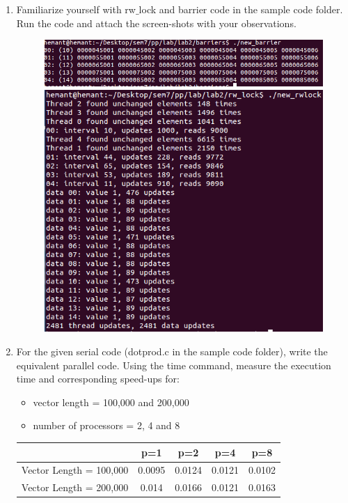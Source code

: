\documentclass{sem5}
\author{Dilip Puri}
\begin{document}
\begin{enumerate}
\item Familiarize yourself with rw$\_$lock and barrier code in the sample code folder. Run the code and attach the screen-shots with your observations.
\begin{figure}[!htp]
\centering
\includegraphics[scale=.4]{../barrier.png}\\
\includegraphics[scale=.4]{../rwlock.png}
\end{figure}
\item For the given serial code (dotprod.c in the sample code folder), write the equivalent parallel code. Using the time command, measure the execution time and corresponding speed-ups for:\\
\begin{itemize}
\item vector length = 100,000 and 200,000
\item number of processors = 2, 4 and 8
\end{itemize}
\begin{center}
\begin{tabular}{|c|c|c|c|c|}
\hline
& p=1 & p=2 & p=4 & p=8\\
\hline
Vector Length = 100,000 & 0.0095 & 0.0124 & 0.0121 & 0.0102 \\
\hline
Vector Length = 200,000 & 0.014 & 0.0166 & 0.0121 & 0.0163 \\
\hline
\end{tabular}

\end{center}
\end{enumerate}
\end{document}
